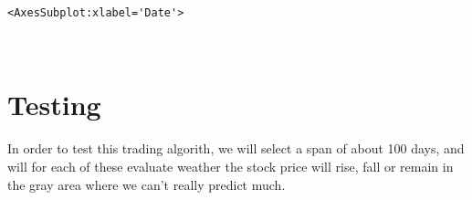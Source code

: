 \documentclass[11pt]{article}
\makeatletter
\newcommand{\boxspacing}{\kern\kvtcb@left@rule\kern\kvtcb@boxsep}
\newcommand{\prompt}[4]{
        \ttfamily\llap{{\color{#2}[#3]:\hspace{3pt}#4}}\vspace{-\baselineskip}
    }
\makeatother
\begin{document}
            \begin{tcolorbox}[breakable, size=fbox, boxrule=.5pt, pad at break*=1mm, opacityfill=0]
\prompt{Out}{outcolor}{11}{\boxspacing}
\begin{Verbatim}[commandchars=\\\{\}]
<AxesSubplot:xlabel='Date'>
\end{Verbatim}
\end{tcolorbox}
        
    \begin{center}
    \end{center}
    { \hspace*{\fill} \\}
    
    \hypertarget{testing}{%
\section{Testing}\label{testing}}

In order to test this trading algorith, we will select a span of about
100 days, and will for each of these evaluate weather the stock price
will rise, fall or remain in the gray area where we can't really predict
much.
\end{document}
